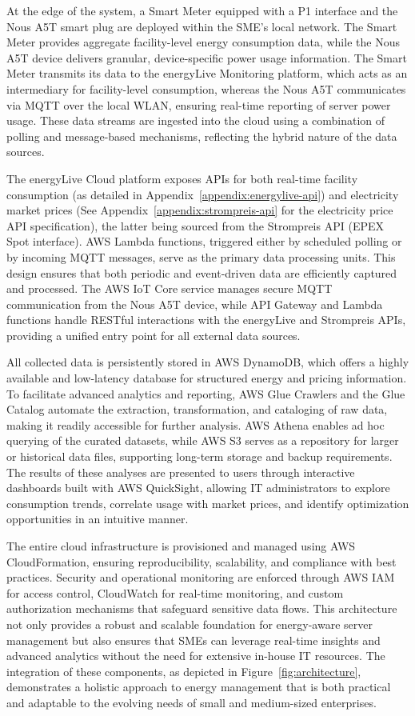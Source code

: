 At the edge of the system, a Smart Meter equipped with a P1 interface and the Nous A5T smart plug are deployed within the SME's local network. The Smart Meter provides aggregate facility-level energy consumption data, while the Nous A5T device delivers granular, device-specific power usage information. The Smart Meter transmits its data to the energyLive Monitoring platform, which acts as an intermediary for facility-level consumption, whereas the Nous A5T communicates via MQTT over the local WLAN, ensuring real-time reporting of server power usage. These data streams are ingested into the cloud using a combination of polling and message-based mechanisms, reflecting the hybrid nature of the data sources.

The energyLive Cloud platform exposes APIs for both real-time facility consumption (as detailed in Appendix~\ref{appendix:energylive-api}) and electricity market prices (See Appendix~\ref{appendix:strompreis-api} for the electricity price API specification), the latter being sourced from the Strompreis API (EPEX Spot interface). AWS Lambda functions, triggered either by scheduled polling or by incoming MQTT messages, serve as the primary data processing units. This design ensures that both periodic and event-driven data are efficiently captured and processed. The AWS IoT Core service manages secure MQTT communication from the Nous A5T device, while API Gateway and Lambda functions handle RESTful interactions with the energyLive and Strompreis APIs, providing a unified entry point for all external data sources.

All collected data is persistently stored in AWS DynamoDB, which offers a highly available and low-latency database for structured energy and pricing information. To facilitate advanced analytics and reporting, AWS Glue Crawlers and the Glue Catalog automate the extraction, transformation, and cataloging of raw data, making it readily accessible for further analysis. AWS Athena enables ad hoc querying of the curated datasets, while AWS S3 serves as a repository for larger or historical data files, supporting long-term storage and backup requirements. The results of these analyses are presented to users through interactive dashboards built with AWS QuickSight, allowing IT administrators to explore consumption trends, correlate usage with market prices, and identify optimization opportunities in an intuitive manner.

The entire cloud infrastructure is provisioned and managed using AWS CloudFormation, ensuring reproducibility, scalability, and compliance with best practices. Security and operational monitoring are enforced through AWS IAM for access control, CloudWatch for real-time monitoring, and custom authorization mechanisms that safeguard sensitive data flows. This architecture not only provides a robust and scalable foundation for energy-aware server management but also ensures that SMEs can leverage real-time insights and advanced analytics without the need for extensive in-house IT resources. The integration of these components, as depicted in Figure~\ref{fig:architecture}, demonstrates a holistic approach to energy management that is both practical and adaptable to the evolving needs of small and medium-sized enterprises.

